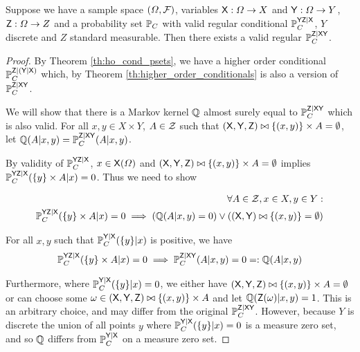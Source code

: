 \begin{theorem}
Suppose we have a sample space $(\Omega,\mathcal{F})$, variables $\mathsf{X}:\Omega\to X$ and $\mathsf{Y}:\Omega\to Y$, $\mathsf{Z}:\Omega\to Z$ and a probability set $\mathbb{P}_C$ with valid regular conditional $\mathbb{P}_C^{\mathsf{YZ}|\mathsf{X}}$, $Y$ discrete and $Z$ standard measurable. Then there exists a valid regular $\mathbb{P}_C^{\mathsf{Z}|\mathsf{XY}}$.
\end{theorem}

\begin{proof}
By Theorem \ref{th:ho_cond_psets}, we have a higher order conditional $\mathbb{P}_C^{\mathsf{Z}|(\mathsf{Y}|\mathsf{X})}$ which, by Theorem \ref{th:higher_order_conditionals} is also a version of $\mathbb{P}_C^{\mathsf{Z}|\mathsf{XY}}$.

We will show that there is a Markov kernel $\mathbb{Q}$ almost surely equal to $\mathbb{P}_C^{\mathsf{Z}|\mathsf{XY}}$ which is also valid. For all $x,y\in X\times Y$, $A\in\mathcal{Z}$ such that $(\mathsf{X},\mathsf{Y},\mathsf{Z})\bowtie\{(x,y)\}\times A=\emptyset$, let $\mathbb{Q}(A|x,y)=\mathbb{P}_C^{\mathsf{Z}|\mathsf{XY}}(A|x,y)$.

By validity of $\mathbb{P}_C^{\mathsf{YZ}|\mathsf{X}}$, $x\in \mathsf{X}(\Omega)$ and $(\mathsf{X},\mathsf{Y},\mathsf{Z})\bowtie\{(x,y)\}\times A=\emptyset$ implies $\mathbb{P}_C^{\mathsf{YZ}|\mathsf{X}}(\{y\}\times A|x)=0$. Thus we need to show

\begin{align}
    \forall A\in \mathcal{Z}, x\in X, y\in Y:\\ \mathbb{P}_C^{\mathsf{YZ}|\mathsf{X}}(\{y\}\times A|x)=0 \implies \left(\mathbb{Q}(A|x,y) = 0\right) \lor \left((\mathsf{X},\mathsf{Y})\bowtie \{(x,y)\} = \emptyset\right)
\end{align}

For all $x,y$ such that $\mathbb{P}_{C}^{\mathsf{Y}|\mathsf{X}}(\{y\}|x)$ is positive, we have
\begin{align}
    \mathbb{P}_C^{\mathsf{YZ}|\mathsf{X}}(\{y\}\times A|x)=0\implies \mathbb{P}_C^{\mathsf{Z}|\mathsf{XY}}(A|x,y)=0=:\mathbb{Q}(A|x,y)
\end{align}

Furthermore, where $\mathbb{P}_{C}^{\mathsf{Y}|\mathsf{X}}(\{y\}|x)=0$, we either have $(\mathsf{X},\mathsf{Y},\mathsf{Z})\bowtie\{(x,y)\}\times A= \emptyset$ or can choose some $\omega\in (\mathsf{X},\mathsf{Y},\mathsf{Z})\bowtie\{(x,y)\}\times A$ and let $\mathbb{Q}(\mathsf{Z}(\omega)|x,y) = 1$. This is an arbitrary choice, and may differ from the original $\mathbb{P}_C^{\mathsf{Z}|\mathsf{XY}}$. However, because $Y$ is discrete the union of all points $y$ where $\mathbb{P}_{C}^{\mathsf{Y}|\mathsf{X}}(\{y\}|x)=0$ is a measure zero set, and so $\mathbb{Q}$ differs from $\mathbb{P}_{C}^{\mathsf{Y}|\mathsf{X}}$ on a measure zero set.
\end{proof}

